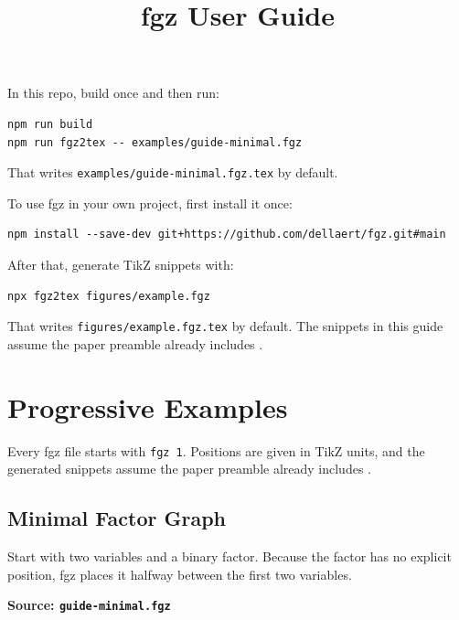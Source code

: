 \documentclass{article}
\title{fgz User Guide}
\author{}
\date{}
\begin{document}
\maketitle

In this repo, build once and then run:

\begin{verbatim}
npm run build
npm run fgz2tex -- examples/guide-minimal.fgz
\end{verbatim}

That writes \texttt{examples/guide-minimal.fgz.tex} by default.

To use fgz in your own project, first install it once:

\begin{verbatim}
npm install --save-dev git+https://github.com/dellaert/fgz.git#main
\end{verbatim}

After that, generate TikZ snippets with:

\begin{verbatim}
npx fgz2tex figures/example.fgz
\end{verbatim}

That writes \texttt{figures/example.fgz.tex} by default. The snippets in this guide
assume the paper preamble already includes \verb||.

\section{Progressive Examples}

Every fgz file starts with \texttt{fgz 1}. Positions are given in TikZ units, and the
generated snippets assume the paper preamble already includes \verb||.

\subsection{Minimal Factor Graph}
Start with two variables and a binary factor. Because the factor has no explicit
position, fgz places it halfway between the first two variables.

\begin{samepage}
  \noindent
  \begin{minipage}[t]{0.41\textwidth}
    \centering
    \vspace{0.5cm}
    
  \end{minipage}\hfill
  \begin{minipage}[t]{0.55\textwidth}
    \textbf{Source: \texttt{guide-minimal.fgz}}
  \end{minipage}
\end{samepage}
\end{document}
